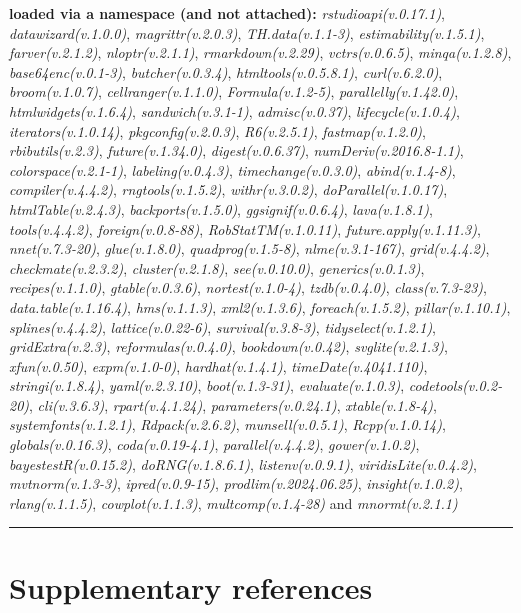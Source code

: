 \documentclass[
  bookmarksnumbered]{article}
\begin{document}
\textbf{loaded via a namespace (and not attached):}
\emph{rstudioapi(v.0.17.1)}, \emph{datawizard(v.1.0.0)}, \emph{magrittr(v.2.0.3)}, \emph{TH.data(v.1.1-3)}, \emph{estimability(v.1.5.1)}, \emph{farver(v.2.1.2)}, \emph{nloptr(v.2.1.1)}, \emph{rmarkdown(v.2.29)}, \emph{vctrs(v.0.6.5)}, \emph{minqa(v.1.2.8)}, \emph{base64enc(v.0.1-3)}, \emph{butcher(v.0.3.4)}, \emph{htmltools(v.0.5.8.1)}, \emph{curl(v.6.2.0)}, \emph{broom(v.1.0.7)}, \emph{cellranger(v.1.1.0)}, \emph{Formula(v.1.2-5)}, \emph{parallelly(v.1.42.0)}, \emph{htmlwidgets(v.1.6.4)}, \emph{sandwich(v.3.1-1)}, \emph{admisc(v.0.37)}, \emph{lifecycle(v.1.0.4)}, \emph{iterators(v.1.0.14)}, \emph{pkgconfig(v.2.0.3)}, \emph{R6(v.2.5.1)}, \emph{fastmap(v.1.2.0)}, \emph{rbibutils(v.2.3)}, \emph{future(v.1.34.0)}, \emph{digest(v.0.6.37)}, \emph{numDeriv(v.2016.8-1.1)}, \emph{colorspace(v.2.1-1)}, \emph{labeling(v.0.4.3)}, \emph{timechange(v.0.3.0)}, \emph{abind(v.1.4-8)}, \emph{compiler(v.4.4.2)}, \emph{rngtools(v.1.5.2)}, \emph{withr(v.3.0.2)}, \emph{doParallel(v.1.0.17)}, \emph{htmlTable(v.2.4.3)}, \emph{backports(v.1.5.0)}, \emph{ggsignif(v.0.6.4)}, \emph{lava(v.1.8.1)}, \emph{tools(v.4.4.2)}, \emph{foreign(v.0.8-88)}, \emph{RobStatTM(v.1.0.11)}, \emph{future.apply(v.1.11.3)}, \emph{nnet(v.7.3-20)}, \emph{glue(v.1.8.0)}, \emph{quadprog(v.1.5-8)}, \emph{nlme(v.3.1-167)}, \emph{grid(v.4.4.2)}, \emph{checkmate(v.2.3.2)}, \emph{cluster(v.2.1.8)}, \emph{see(v.0.10.0)}, \emph{generics(v.0.1.3)}, \emph{recipes(v.1.1.0)}, \emph{gtable(v.0.3.6)}, \emph{nortest(v.1.0-4)}, \emph{tzdb(v.0.4.0)}, \emph{class(v.7.3-23)}, \emph{data.table(v.1.16.4)}, \emph{hms(v.1.1.3)}, \emph{xml2(v.1.3.6)}, \emph{foreach(v.1.5.2)}, \emph{pillar(v.1.10.1)}, \emph{splines(v.4.4.2)}, \emph{lattice(v.0.22-6)}, \emph{survival(v.3.8-3)}, \emph{tidyselect(v.1.2.1)}, \emph{gridExtra(v.2.3)}, \emph{reformulas(v.0.4.0)}, \emph{bookdown(v.0.42)}, \emph{svglite(v.2.1.3)}, \emph{xfun(v.0.50)}, \emph{expm(v.1.0-0)}, \emph{hardhat(v.1.4.1)}, \emph{timeDate(v.4041.110)}, \emph{stringi(v.1.8.4)}, \emph{yaml(v.2.3.10)}, \emph{boot(v.1.3-31)}, \emph{evaluate(v.1.0.3)}, \emph{codetools(v.0.2-20)}, \emph{cli(v.3.6.3)}, \emph{rpart(v.4.1.24)}, \emph{parameters(v.0.24.1)}, \emph{xtable(v.1.8-4)}, \emph{systemfonts(v.1.2.1)}, \emph{Rdpack(v.2.6.2)}, \emph{munsell(v.0.5.1)}, \emph{Rcpp(v.1.0.14)}, \emph{globals(v.0.16.3)}, \emph{coda(v.0.19-4.1)}, \emph{parallel(v.4.4.2)}, \emph{gower(v.1.0.2)}, \emph{bayestestR(v.0.15.2)}, \emph{doRNG(v.1.8.6.1)}, \emph{listenv(v.0.9.1)}, \emph{viridisLite(v.0.4.2)}, \emph{mvtnorm(v.1.3-3)}, \emph{ipred(v.0.9-15)}, \emph{prodlim(v.2024.06.25)}, \emph{insight(v.1.0.2)}, \emph{rlang(v.1.1.5)}, \emph{cowplot(v.1.1.3)}, \emph{multcomp(v.1.4-28)} and \emph{mnormt(v.2.1.1)}

\begin{center}\rule{0.5\linewidth}{0.5pt}\end{center}

\section{Supplementary references}\label{refs}

\begin{multicols}{2}
\AtNextBibliography{\footnotesize}
\printbibliography[heading=none]
\normalsize
\end{multicols}

\def\printbibliography{}

\printbibliography
\end{document}
